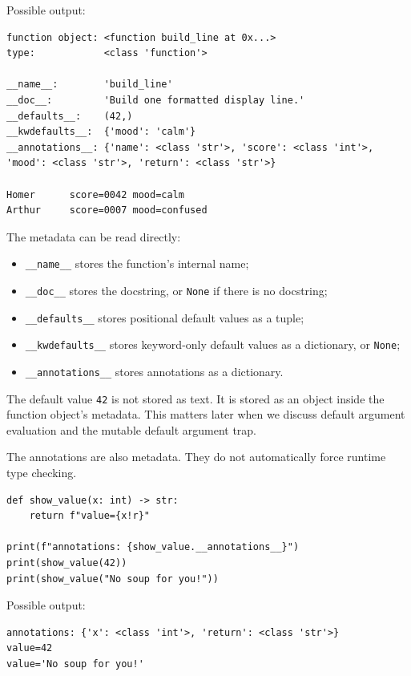 Possible output:

\begin{verbatim}
function object: <function build_line at 0x...>
type:            <class 'function'>

__name__:        'build_line'
__doc__:         'Build one formatted display line.'
__defaults__:    (42,)
__kwdefaults__:  {'mood': 'calm'}
__annotations__: {'name': <class 'str'>, 'score': <class 'int'>, 'mood': <class 'str'>, 'return': <class 'str'>}

Homer      score=0042 mood=calm
Arthur     score=0007 mood=confused
\end{verbatim}

The metadata can be read directly:

\begin{itemize}
    \item \texttt{\_\_name\_\_} stores the function's internal name;
    \item \texttt{\_\_doc\_\_} stores the docstring, or \texttt{None} if there is no docstring;
    \item \texttt{\_\_defaults\_\_} stores positional default values as a tuple;
    \item \texttt{\_\_kwdefaults\_\_} stores keyword-only default values as a dictionary, or \texttt{None};
    \item \texttt{\_\_annotations\_\_} stores annotations as a dictionary.
\end{itemize}

The default value \texttt{42} is not stored as text. It is stored as an object inside the function object's metadata. This matters later when we discuss default argument evaluation and the mutable default argument trap.

The annotations are also metadata. They do not automatically force runtime type checking.

\begin{verbatim}
def show_value(x: int) -> str:
    return f"value={x!r}"

print(f"annotations: {show_value.__annotations__}")
print(show_value(42))
print(show_value("No soup for you!"))
\end{verbatim}

Possible output:

\begin{verbatim}
annotations: {'x': <class 'int'>, 'return': <class 'str'>}
value=42
value='No soup for you!'
\end{verbatim}


